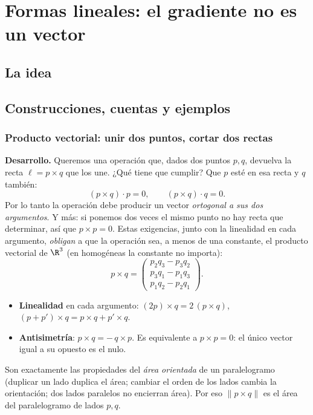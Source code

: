 \chapter{Formas lineales: el gradiente no es un vector}\label{cap:formas-lineales}

\section{La idea}

\section{Construcciones, cuentas y ejemplos}

\subsection{Producto vectorial: unir dos puntos, cortar dos rectas}\label{sec:vectorial}

\textbf{Desarrollo.} Queremos una operación que, dados dos puntos \(p,q\), devuelva la recta
\(\ell=p\times q\) que los une. ¿Qué tiene que cumplir? Que \(p\) esté en esa recta y \(q\)
también:
\[
  (p\times q)\cdot p=0,\qquad (p\times q)\cdot q=0 .
\]
Por lo tanto la operación debe producir un vector \emph{ortogonal a sus dos argumentos}. Y
más: si ponemos dos veces el mismo punto no hay recta que determinar, así que \(p\times p=0\).
Estas exigencias, junto con la linealidad en cada argumento, \emph{obligan} a que la
operación sea, a menos de una constante, el producto vectorial de \(\R^3\) (en homogéneas
la constante no importa):
\[
  p\times q=\begin{pmatrix}p_2q_3-p_3q_2\\ p_3q_1-p_1q_3\\ p_1q_2-p_2q_1\end{pmatrix}.
\]

\begin{resultado}
\begin{itemize}
  \item \textbf{Linealidad} en cada argumento: \((2p)\times q=2\,(p\times q)\),
  \((p+p')\times q=p\times q+p'\times q\).
  \item \textbf{Antisimetría}: \(p\times q=-\,q\times p\). Es equivalente a \(p\times p=0\):
  el único vector igual a su opuesto es el nulo.
\end{itemize}
Son exactamente las propiedades del \emph{área orientada} de un paralelogramo (duplicar un
lado duplica el área; cambiar el orden de los lados cambia la orientación; dos lados
paralelos no encierran área). Por eso \(\lVert p\times q\rVert\) es el área del paralelogramo
de lados \(p,q\).
\end{resultado}

